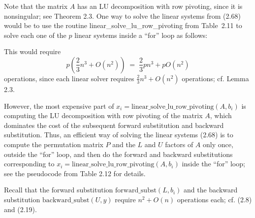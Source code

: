 Note that the matrix $A$ has an LU decomposition with row pivoting, since it
is nonsingular; see Theorem 2.3. One way to solve the linear systems from
(2.68) would be to use the routine linear\_solve\_lu\_row\_pivoting from
Table~2.11 to solve each one of the $p$ linear systems inside a ``for''
loop as follows:

\begin{center}
\end{center}

This would require
\begin{equation}
p\left(\frac{2}{3}n^3 + O(n^2)\right) \;=\; \frac{2}{3}pn^3 + pO(n^2)
\end{equation}
operations, since each linear solver requires $\frac{2}{3}n^3+O(n^2)$
operations; cf. Lemma 2.3.

However, the most expensive part of
$x_i = \text{linear\_solve\_lu\_row\_pivoting}(A,b_i)$ is computing the LU
decomposition with row pivoting of the matrix $A$, which dominates the cost
of the subsequent forward substitution and backward substitution. Thus, an
efficient way of solving the linear systems (2.68) is to compute the
permutation matrix $P$ and the $L$ and $U$ factors of $A$ only once,
outside the ``for'' loop, and then do the forward and backward
substitutions corresponding to
$x_i = \text{linear\_solve\_lu\_row\_pivoting}(A,b_i)$ inside the ``for''
loop; see the pseudocode from Table 2.12 for details.

Recall that the forward substitution $\text{forward\_subst}(L,b_i)$ and the
backward substitution $\text{backward\_subst}(U,y)$ require $n^2+O(n)$
operations each; cf. (2.8) and (2.19).
